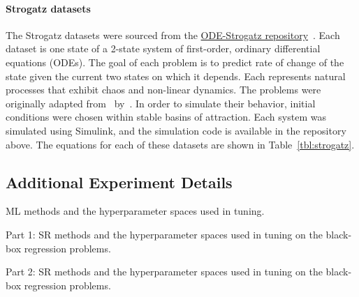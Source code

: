 \paragraph{Strogatz datasets}
The Strogatz datasets were sourced from the \href{https://github.com/lacava/ode-strogatz}{ODE-Strogatz repository}~\cite{lacavaInferenceCompactNonlinear2016}.
Each dataset is one state of a 2-state system of first-order, ordinary differential equations (ODEs). 
The goal of each problem is to predict rate of change of the state given the current two states on which it depends. 
Each represents natural processes that exhibit chaos and non-linear dynamics.
The problems were originally adapted from~\cite{strogatzNonlinearDynamicsChaos2014} by~\citet{schmidtMachineScienceAutomated2011}.   
In order to simulate their behavior, initial conditions were chosen within stable basins of attraction.
Each system was simulated using Simulink, and the simulation code is available in the repository above.
The equations for each of these datasets are shown in Table~\ref{tbl:strogatz}.



\subsection{Additional Experiment Details}




\begin{table}
    \footnotesize
    \centering

    \caption{
        ML methods and the hyperparameter spaces used in tuning.
    }
	\label{tbl:ml_methods}
    
    
\end{table}

\begin{table}
    \footnotesize
    \centering
    \caption{
        Part 1: SR methods and the hyperparameter spaces used in tuning on the black-box regression problems.
    }
	\label{tbl:sr_methods1}
    
\end{table}

\begin{table}
    \scriptsize

    \centering

    \caption{
        Part 2: SR methods and the hyperparameter spaces used in tuning on the black-box regression problems.
    }
	\label{tbl:sr_methods2}
    
\end{table}


